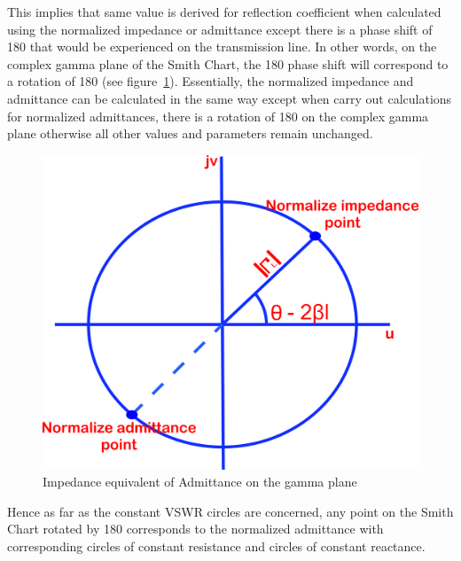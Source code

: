 This implies that same value is derived for reflection coefficient when calculated using the normalized impedance or admittance except there is a phase shift of 180\textdegree\; that would be experienced on the transmission line. In other words, on the complex gamma plane of the Smith Chart, the 180\textdegree\; phase shift will correspond to a rotation of 180\textdegree\; (see figure~\ref{fig:zstyuiou}). Essentially, the normalized impedance and admittance can be calculated in the same way except when carry out calculations for normalized admittances, there is a rotation of 180\textdegree\; on the complex gamma plane otherwise all other values and parameters remain unchanged.
\begin{figure}[h]
\centering
\includegraphics[width=0.6\linewidth]{./graphics/zstyuiou}
\caption{Impedance equivalent of Admittance on the gamma plane}
\label{fig:zstyuiou}
\end{figure}

Hence as far as the constant VSWR circles are concerned, any point on the Smith Chart rotated by 180\textdegree\; corresponds to the normalized admittance with corresponding circles of constant resistance and circles of constant reactance. 

